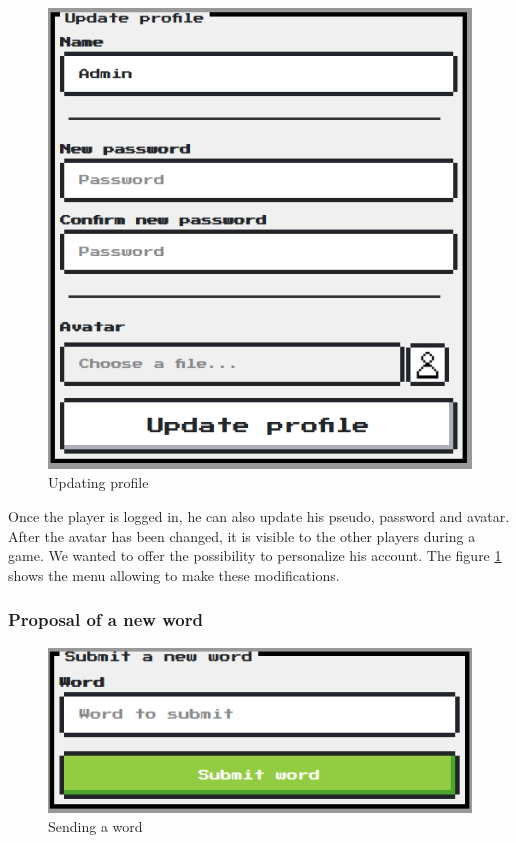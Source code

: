 \documentclass{tnreport}
\begin{document}
\begin{figure}
	\centering
	\vspace*{-2cm}
	\includegraphics[scale=0.5]{figures/update_profile}
	\caption{Updating profile}
	\label{fig:update_profile}
	\vspace*{-3cm}
\end{figure}

Once the player is logged in, he can also update his pseudo, password and avatar. After the avatar has been changed, it is visible to the other players during a game. We wanted to offer the possibility to personalize his account. The figure \ref{fig:update_profile} shows the menu allowing to make these modifications. 

\bigskip
\bigskip

\subsubsection{Proposal of a new word}

\begin{figure}
	\centering
	\includegraphics[scale=0.5]{figures/send_word}
	\caption{Sending a word}
	\label{fig:send_word}
\end{figure}
\end{document}

